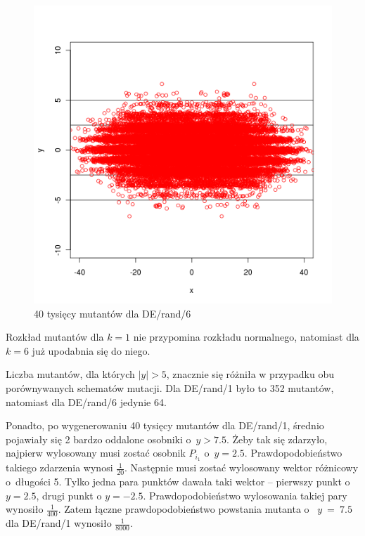 \documentclass[a4paper,onecolumn,oneside,12pt,wide,floatssmall]{mwrep}
\theoremstyle{definition}
\theoremstyle{plain}%
\theoremstyle{remark}
\begin{document}
\begin{figure}[H]
\centering
\includegraphics[width=.65\textwidth]{img/rand6}
\caption{40 tysięcy mutantów dla DE/rand/6} 
\label{fig:10k_rand6}
\end{figure}

Rozkład mutantów dla $k = 1$ nie przypomina rozkładu normalnego, 
natomiast dla $k = 6$ już upodabnia się do niego.

Liczba mutantów, dla których $|y| > 5$, 
znacznie się różniła w przypadku obu porównywanych schematów mutacji. 
Dla DE/rand/1 było to 352 mutantów,
natomiast dla DE/rand/6 jedynie 64. 

Ponadto, po wygenerowaniu 40 tysięcy mutantów dla DE/rand/1, średnio pojawiały
się 2 bardzo oddalone osobniki o~$y > 7.5$. 
Żeby tak się zdarzyło, najpierw wylosowany musi zostać osobnik $P_{i_1}$ o~$y=2.5$.
Prawdopodobieństwo takiego zdarzenia wynosi $\frac{1}{20}$.
Następnie musi zostać wylosowany wektor różnicowy o~długości 5. Tylko jedna para punktów 
dawała taki wektor --
pierwszy punkt o $y = 2.5$, drugi punkt o $y = -2.5$. 
Prawdopodobieństwo wylosowania takiej pary wynosiło $\frac{1}{400}$. 
Zatem łączne prawdopodobieństwo powstania mutanta o~
$y~=~7.5$ dla DE/rand/1 wynosiło $\frac{1}{8000}$. 
\end{document}
